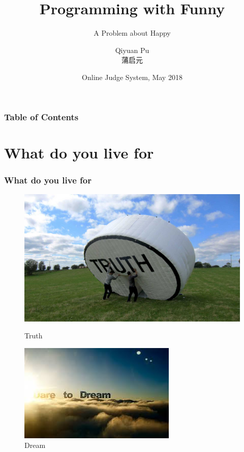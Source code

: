 \documentclass{beamer}
\title[\emph{ACM-ICPC}] %
{Programming with Funny}
\subtitle{A Problem about Happy}
\author[Qiyuan, Pu] %
{Qiyuan Pu\\ 蒲启元}
\institute[SWFU] %
{
  School of Big Data and Intelligence Engineering\\
  Southwest Forestry University
}
\date[Programming Discussion 2018] %
{Online Judge System, May 2018}
\begin{document}
 
\frame{\titlepage}


\begin{frame}
\frametitle{Table of Contents}
\tableofcontents
\end{frame}

\section{What do you live for}
\begin{frame}
  \frametitle{What do you live for}

  \begin{figure}
    \centering
    \begin{minipage}{0.45\textwidth}
        \centering
        \includegraphics[width=.7\textwidth]{./img/Truth.jpg} %
        \caption{Truth}
        \label{fig:sit-one}
    \end{minipage}\hfill
    \begin{minipage}{0.45\textwidth}
      \centering
      \includegraphics[width=.7\textwidth]{./img/dream.jpeg} 
      \caption{Dream}
      \label{fig:sit-three}
    \end{minipage}\hfill
    \begin{minipage}{0.45\textwidth}

\end{minipage}
\end{figure}
\end{frame}
\end{document}
